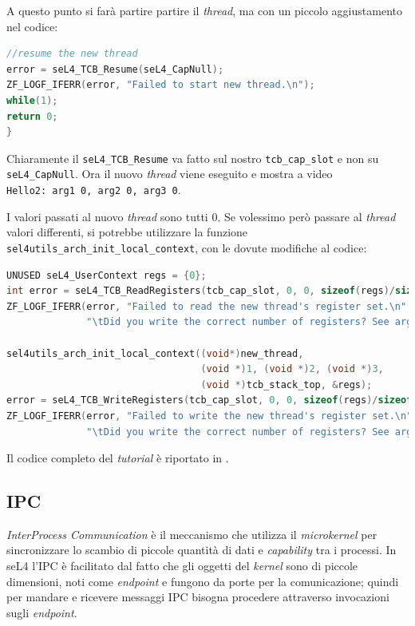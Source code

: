 A questo punto si farà partire partire il \textit{thread}, ma con un piccolo aggiustamento nel codice:
\begin{lstlisting}[language=C++]
//resume the new thread
error = seL4_TCB_Resume(seL4_CapNull);
ZF_LOGF_IFERR(error, "Failed to start new thread.\n");
while(1);
return 0;
}
\end{lstlisting}

Chiaramente il \texttt{seL4\_TCB\_Resume} va fatto sul nostro \texttt{tcb\_cap\_slot} e non su \texttt{seL4\_CapNull}. Ora il nuovo \textit{thread} viene eseguito e mostra a video\\
\texttt{Hello2: arg1 0, arg2 0, arg3 0}.

I valori passati al nuovo \textit{thread} sono tutti 0. Se volessimo però passare al \textit{thread} valori differenti, si potrebbe utilizzare la funzione \texttt{sel4utils\_arch\_init\_local\_context}, con le dovute modifiche al codice:
\begin{lstlisting}[language=C++]
UNUSED seL4_UserContext regs = {0};
int error = seL4_TCB_ReadRegisters(tcb_cap_slot, 0, 0, sizeof(regs)/sizeof(seL4_Word), &regs);
ZF_LOGF_IFERR(error, "Failed to read the new thread's register set.\n"
              "\tDid you write the correct number of registers? See arg4.\n");

sel4utils_arch_init_local_context((void*)new_thread,
                                  (void *)1, (void *)2, (void *)3,
                                  (void *)tcb_stack_top, &regs);
error = seL4_TCB_WriteRegisters(tcb_cap_slot, 0, 0, sizeof(regs)/sizeof(seL4_Word), &regs);
ZF_LOGF_IFERR(error, "Failed to write the new thread's register set.\n"
              "\tDid you write the correct number of registers? See arg4.\n");
\end{lstlisting}
Il codice completo del \textit{tutorial} è riportato in \cite{threads}.

\subsection{IPC}
\textit{InterProcess Communication} è il meccanismo che utilizza il \textit{microkernel} per sincronizzare lo scambio di  piccole quantità di dati e \textit{capability} tra i processi. In seL4 l'IPC è facilitato dal fatto che gli oggetti del \textit{kernel} sono di piccole dimensioni, noti come \textit{endpoint} e fungono da porte per la comunicazione; quindi per mandare e ricevere messaggi IPC bisogna procedere attraverso invocazioni sugli \textit{endpoint}.

